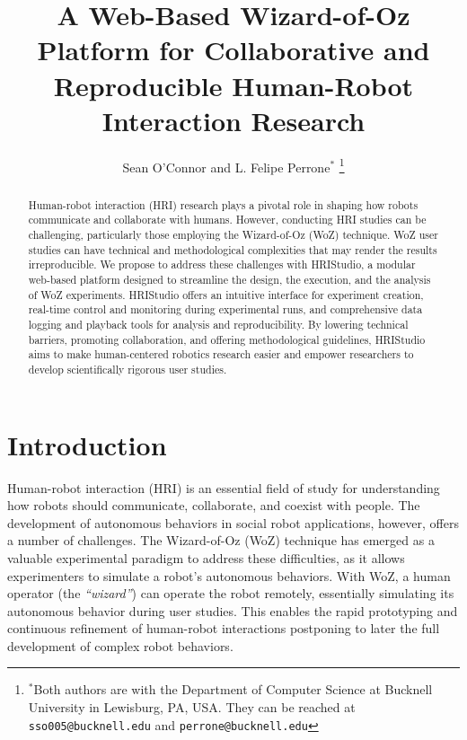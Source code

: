 \documentclass[letterpaper, 10 pt, conference]{subfiles/ieeeconf}
\title{\LARGE \bf A Web-Based Wizard-of-Oz Platform for Collaborative and Reproducible Human-Robot Interaction Research}
\author{Sean O'Connor and L. Felipe Perrone$^{*}$
    \thanks{$^{*}$Both authors are with the Department of Computer Science at
        Bucknell University in Lewisburg, PA, USA. They can be reached at {\tt\small sso005@bucknell.edu} and {\tt\small perrone@bucknell.edu}}%
}
\begin{document}
\maketitle
\thispagestyle{empty}
\pagestyle{empty}


\begin{abstract}

Human-robot interaction (HRI) research plays a pivotal role in shaping how robots communicate and collaborate with humans. However, conducting HRI studies can be challenging, particularly those employing the Wizard-of-Oz (WoZ) technique. WoZ user studies can have technical and methodological complexities that may render the results irreproducible. We propose to address these challenges with HRIStudio, a modular web-based platform designed to streamline the design, the execution, and the analysis of WoZ experiments. HRIStudio offers an intuitive interface for experiment creation, real-time control and monitoring during experimental runs, and comprehensive data logging and playback tools for analysis and reproducibility. By lowering technical barriers, promoting collaboration, and offering methodological guidelines, HRIStudio aims to make human-centered robotics research easier and empower researchers to develop scientifically rigorous user studies.

\end{abstract}



\section{Introduction}

Human-robot interaction (HRI) is an essential field of study for understanding how robots should communicate, collaborate, and coexist with people. The development of autonomous behaviors in social robot applications, however, offers a number of challenges. The Wizard-of-Oz (WoZ) technique has emerged as a valuable experimental paradigm to address these difficulties, as it allows experimenters to simulate a robot's autonomous behaviors. With WoZ, a human operator (the \emph{``wizard''}) can operate the robot remotely, essentially simulating its autonomous behavior during user studies. This enables the rapid prototyping and continuous refinement of human-robot interactions postponing to later the full development of complex robot behaviors.
\end{document}
